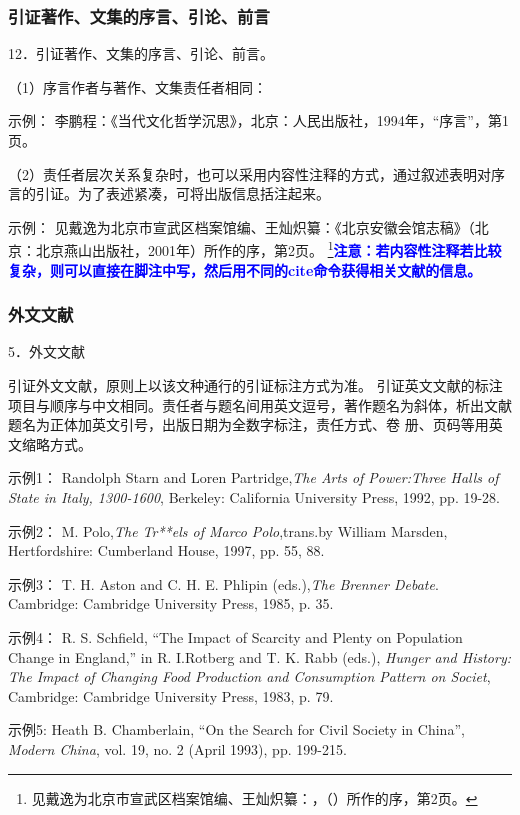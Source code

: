 \documentclass{article}
\newcommand{\qd}[1]{\textbf{\textcolor{blue}{#1}}}
\begin{document}
\subsubsection{引证著作、文集的序言、引论、前言}
12．引证著作、文集的序言、引论、前言。

（1）序言作者与著作、文集责任者相同：

示例：
李鹏程：《当代文化哲学沉思》，北京：人民出版社，1994年，“序言”，第1页。


（2）责任者层次关系复杂时，也可以采用内容性注释的方式，通过叙述表明对序言的引证。为了表述紧凑，可将出版信息括注起来。

示例：
见戴逸为北京市宣武区档案馆编、王灿炽纂：《北京安徽会馆志稿》（北京：北京燕山出版社，2001年）所作的序，第2页。
\footnote{见戴逸为北京市宣武区档案馆编、王灿炽纂：，（）所作的序，第2页。}\qd{注意：若内容性注释若比较复杂，则可以直接在脚注中写，然后用不同的cite命令获得相关文献的信息。}

\subsubsection{外文文献}
5．外文文献

引证外文文献，原则上以该文种通行的引证标注方式为准。
引证英文文献的标注项目与顺序与中文相同。责任者与题名间用英文逗号，著作题名为斜体，析出文献题名为正体加英文引号，出版日期为全数字标注，责任方式、卷
册、页码等用英文缩略方式。

示例1：
Randolph Starn and Loren Partridge,\textit{The Arts of Power:Three Halls of State in Italy, 1300-1600}, Berkeley: California University Press, 1992, pp. 19-28.

示例2：
M. Polo,\textit{The Tr**els of Marco Polo},trans.by William Marsden, Hertfordshire: Cumberland House, 1997, pp. 55, 88.

示例3：
T. H. Aston and C. H. E. Phlipin (eds.),\textit{The Brenner Debate}. Cambridge: Cambridge University Press, 1985, p. 35.

示例4：
R. S. Schfield, “The Impact of Scarcity and Plenty on Population Change in England,” in R. I.Rotberg and T. K. Rabb (eds.), \textit{Hunger and History: The Impact of Changing Food
Production and Consumption Pattern on Societ}, Cambridge: Cambridge University Press, 1983, p. 79.

示例5:
Heath B. Chamberlain, “On the Search for Civil Society in China”, \textit{Modern China}, vol. 19, no. 2 (April 1993), pp. 199-215.


\newpage
\printbibliography[heading=bibliography]
\end{document}
